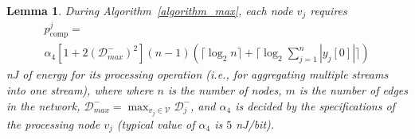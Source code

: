 \documentclass[twocolumn]{autart}    %
\newtheorem{lemma}{\bfseries Lemma}
\begin{document}
\begin{lemma}\label{energy_process}
During Algorithm~\ref{algorithm_max}, each node $v_j$ requires 
\begin{align}
& p^j_{\text{comp}} = & \nonumber \\ 
& \alpha_4 [1 + 2(\mathcal{D}_{max}^-)^2] (n-1) (\lceil \log_{2} n \rceil + \lceil \log_{2} \sum_{j=1}^n | y_j[0] | \rceil) & \label{energy_process_result}
\end{align}
nJ of energy for its processing operation (i.e., for aggregating multiple streams into one stream), where where $n$ is the number of nodes, $m$ is the number of edges in the network, $\mathcal{D}_{max}^- = \max_{v_j \in \mathcal{V}} \mathcal{D}_j^-$, and $\alpha_4$ is decided by the specifications of the processing node $v_j$ (typical value of $\alpha_4$ is $5$ nJ/bit). 
\end{lemma}
\end{document}
